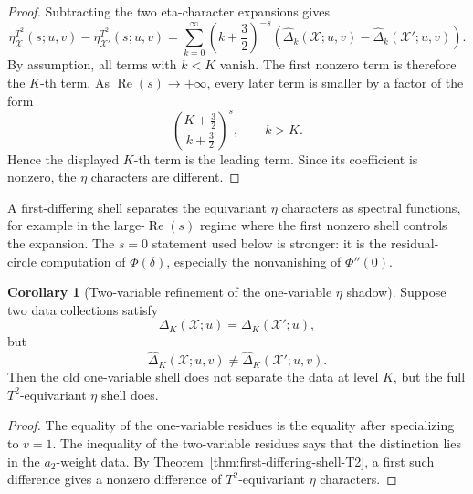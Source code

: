 \documentclass{article}
\theoremstyle{definition}
\newtheorem{corollary}[theorem]{Corollary}
\numberwithin{equation}{section}
\begin{document}
\begin{proof}
Subtracting the two eta-character expansions gives
\begin{equation}
\eta^{T^2}_{\mathcal X}(s;u,v)
-
\eta^{T^2}_{\mathcal X'}(s;u,v)
=
\sum_{k=0}^{\infty}
\left(k+\frac32\right)^{-s}
\left(
\widehat\Delta_k(\mathcal X;u,v)
-
\widehat\Delta_k(\mathcal X';u,v)
\right).
\end{equation}
By assumption, all terms with $k<K$ vanish.  The first nonzero term is therefore the $K$-th term.  As $\operatorname{Re}(s)\to+\infty$, every later term is smaller by a factor of the form
\begin{equation}
\left(\frac{K+\frac32}{k+\frac32}\right)^{s},
\qquad
k>K.
\end{equation}
Hence the displayed $K$-th term is the leading term.  Since its coefficient is nonzero, the $\eta$ characters are different.
\end{proof}

A first-differing shell separates the equivariant $\eta$ characters as spectral functions, for example in the large-$\operatorname{Re}(s)$ regime where the first nonzero shell controls the expansion.  The $s=0$ statement used below is stronger: it is the residual-circle computation of $\Phi(\delta)$, especially the nonvanishing of $\Phi''(0)$.

\begin{corollary}[Two-variable refinement of the one-variable $\eta$ shadow]
Suppose two data collections satisfy
\begin{equation}
\Delta_K(\mathcal X;u)
=
\Delta_K(\mathcal X';u),
\end{equation}
but
\begin{equation}
\widehat\Delta_K(\mathcal X;u,v)
\neq
\widehat\Delta_K(\mathcal X';u,v).
\end{equation}
Then the old one-variable shell does not separate the data at level $K$, but the full $T^2$-equivariant $\eta$ shell does.
\end{corollary}

\begin{proof}
The equality of the one-variable residues is the equality after specializing to $v=1$.  The inequality of the two-variable residues says that the distinction lies in the $a_2$-weight data.  By Theorem~\ref{thm:first-differing-shell-T2}, a first such difference gives a nonzero difference of $T^2$-equivariant $\eta$ characters.
\end{proof}
\end{document}

